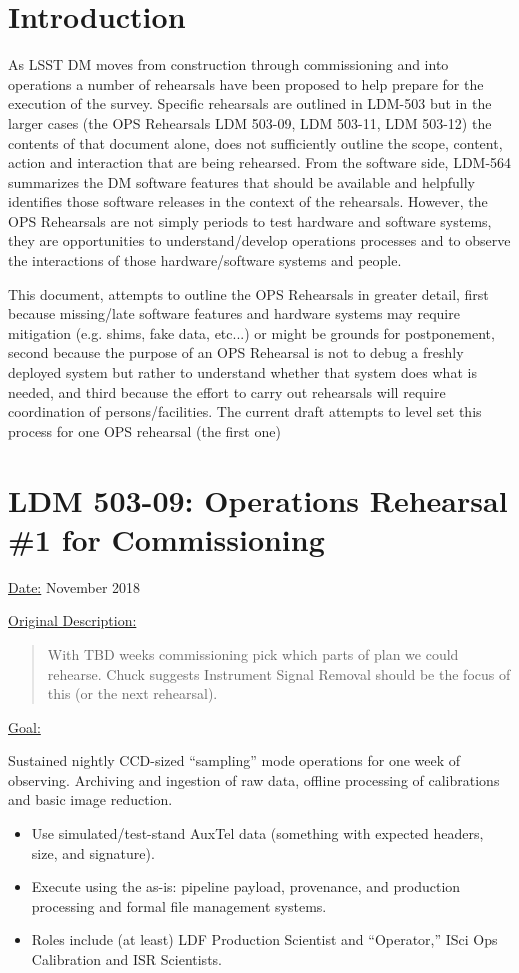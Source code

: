 
\section{Introduction}

As LSST DM moves from construction through commissioning and into operations 
a number of rehearsals have been proposed to help prepare for the execution 
of the survey.  Specific rehearsals are outlined in LDM-503 but in the larger 
cases (the OPS Rehearsals LDM 503-09, LDM 503-11, LDM 503-12) the contents of 
that document alone, does not sufficiently outline the scope, content, action 
and interaction that are being rehearsed.  From the software side, LDM-564 
summarizes the DM software features that should be available and helpfully 
identifies those software releases in the context of the rehearsals.  
However, the OPS Rehearsals are not simply periods to test hardware and 
software systems, they are opportunities to understand/develop operations 
processes and to observe the interactions of those hardware/software systems 
and people. 

This document, attempts to outline the OPS Rehearsals in greater detail, 
first because missing/late software features and hardware systems may 
require mitigation (e.g. shims, fake data, etc...) or might be grounds for 
postponement, second because the purpose of an OPS Rehearsal is not to debug 
a freshly deployed system but rather to understand whether that system does
what is needed, and third because the effort to carry out rehearsals will 
require coordination of persons/facilities.  The current draft attempts to 
level set this process for one OPS rehearsal (the first one)


\section{LDM 503-09: Operations Rehearsal \#1 for Commissioning}

\underline{Date:} November 2018

\underline{Original Description:} \begin{quote}
With TBD weeks commissioning pick which parts of plan we could 
rehearse.  Chuck suggests Instrument Signal Removal should be the focus 
of this (or the next rehearsal).
\end{quote}

\underline{Goal:}

Sustained nightly CCD-sized “sampling” mode operations for one week of 
observing.  Archiving and ingestion of raw data, offline processing of 
calibrations and basic image reduction.
\begin{itemize}
\item Use simulated/test-stand AuxTel data (something with expected 
headers, size, and signature).

\item Execute using the as-is: pipeline payload, provenance, and 
production processing and formal file management systems.

\item Roles include (at least) LDF Production Scientist and “Operator,” 
ISci Ops Calibration and ISR Scientists.
\end{itemize}

